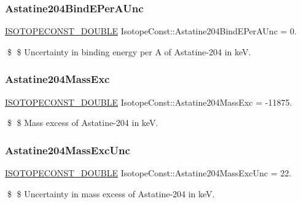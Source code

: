\subsubsection{\texorpdfstring{Astatine204\+Bind\+E\+Per\+A\+Unc}{Astatine204BindEPerAUnc}}
{\footnotesize\ttfamily \mbox{\hyperlink{group___isotope_const-_macros_ga8f45a7272ce02c0b4c65c44636ed719a}{I\+S\+O\+T\+O\+P\+E\+C\+O\+N\+S\+T\+\_\+\+D\+O\+U\+B\+LE}} Isotope\+Const\+::\+Astatine204\+Bind\+E\+Per\+A\+Unc = 0.}

\$ \$ Uncertainty in binding energy per A of Astatine-\/204 in keV. \mbox{\label{group___isotope_const-_astatine-_at204_ga00092d0c32940a3002f6bf8c2897d751}} 
\subsubsection{\texorpdfstring{Astatine204\+Mass\+Exc}{Astatine204MassExc}}
{\footnotesize\ttfamily \mbox{\hyperlink{group___isotope_const-_macros_ga8f45a7272ce02c0b4c65c44636ed719a}{I\+S\+O\+T\+O\+P\+E\+C\+O\+N\+S\+T\+\_\+\+D\+O\+U\+B\+LE}} Isotope\+Const\+::\+Astatine204\+Mass\+Exc = -\/11875.}

\$ \$ Mass excess of Astatine-\/204 in keV. \mbox{\label{group___isotope_const-_astatine-_at204_ga558141927a640dfef736b504c0594308}} 
\subsubsection{\texorpdfstring{Astatine204\+Mass\+Exc\+Unc}{Astatine204MassExcUnc}}
{\footnotesize\ttfamily \mbox{\hyperlink{group___isotope_const-_macros_ga8f45a7272ce02c0b4c65c44636ed719a}{I\+S\+O\+T\+O\+P\+E\+C\+O\+N\+S\+T\+\_\+\+D\+O\+U\+B\+LE}} Isotope\+Const\+::\+Astatine204\+Mass\+Exc\+Unc = 22.}

\$ \$ Uncertainty in mass excess of Astatine-\/204 in keV. \mbox{\label{group___isotope_const-_astatine-_at204_ga74b3aeaa2b8b99206e4912ea5aa36212}} 
